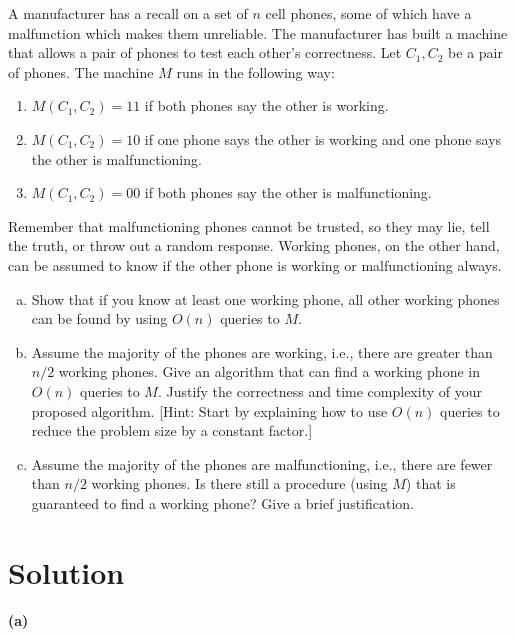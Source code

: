 \documentclass[11pt]{article}
\begin{document}
    \begin{tcolorbox}[title={Problem 3 (Malfunctioning Phones, 40 pts)}]
        A manufacturer has a recall on a set of $n$ cell phones, some of which have a malfunction which makes them unreliable. The manufacturer has built a machine that allows a pair of phones to test each other's correctness. Let $C_1, C_2$ be a pair of phones. The machine $M$ runs in the following way:
        \begin{enumerate}
            \item $M(C_1, C_2) = 11$ if both phones say the other is working.
            \item $M(C_1, C_2) = 10$ if one phone says the other is working and one phone says the other is malfunctioning. 
            \item $M(C_1, C_2) = 00$ if both phones say the other is malfunctioning. 
        \end{enumerate}
        Remember that malfunctioning phones cannot be trusted, so they may lie, tell the truth, or throw out a random response. Working phones, on the other hand, can be assumed to know if the other phone is working or malfunctioning always. 
        \begin{enumerate}[(a)]
            \item Show that if you know at least one working phone, all other working phones can be found by using $O(n)$ queries to $M$.
            \item Assume the majority of the phones are working, i.e., there are greater than $n/2$ working phones. Give an algorithm that can find a working phone in $O(n)$ queries to $M$. Justify the correctness and time complexity of your proposed algorithm. [Hint: Start by explaining how to use $O(n)$ queries to reduce the problem size by a constant factor.]
            \item Assume the majority of the phones are malfunctioning, i.e., there are fewer than $n/2$ working phones. Is there still a procedure (using $M$) that is guaranteed to find a working phone? Give a brief justification.
        \end{enumerate}
    \end{tcolorbox}
       
    \section*{Solution}
    \smallskip        

    \textbf{(a) }
    
\end{document}
